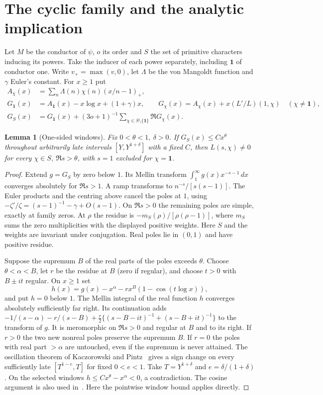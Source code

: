\documentclass[letterpaper,11pt]{article}
\newtheorem{lemma}[proposition]{Lemma}
\begin{document}
\section{The cyclic family and the analytic implication}\label{sec:analytic}
Let \(M\) be the conductor of \(\psi\), \(o\) its order and \(S\) the set of primitive characters inducing its powers. Take the inducer of each power separately, including \(\mathbf1\) of conductor one. Write \(v_+=\max(v,0)\), let \(\Lambda\) be the von Mangoldt function and \(\gamma\) Euler's constant. For \(x\ge1\) put
\begin{align*}
 A_\chi(x)&=\sum_n\Lambda(n)\chi(n)(x/n-1)_+,\\
 G_{\mathbf1}(x)&=A_{\mathbf1}(x)-x\log x+(1+\gamma)x,\qquad
 G_\chi(x)=A_\chi(x)+x(L'/L)(1,\chi)\quad(\chi\ne\mathbf1),\\
 G_S(x)&=G_{\mathbf1}(x)+(3o+1)^{-1}\sum_{\chi\in S\setminus\{\mathbf1\}}\Re G_\chi(x).
\end{align*}
\begin{lemma}[One-sided windows]\label{lem:landau}
Fix \(0<\theta<1,\ \delta>0\). If \(G_S(x)\le Cx^\theta\) throughout arbitrarily late intervals \([Y,Y^{1+\delta}]\) with a fixed \(C\), then \(L(s,\chi)\ne0\) for every \(\chi\in S,\ \Re s>\theta\), with \(s=1\) excluded for \(\chi=\mathbf1\).
\end{lemma}
\begin{proof}
Extend \(g=G_S\) by zero below \(1\). Its Mellin transform \(\int_1^\infty g(x)x^{-s-1}\,dx\) converges absolutely for \(\Re s>1\). A ramp transforms to \(n^{-s}/[s(s-1)]\). The Euler products and the centring above cancel the poles at \(1\), using \(-\zeta'/\zeta=(s-1)^{-1}-\gamma+O(s-1)\). On \(\Re s>0\) the remaining poles are simple, exactly at family zeros. At \(\rho\) the residue is \(-m_S(\rho)/[\rho(\rho-1)]\), where \(m_S\) sums the zero multiplicities with the displayed positive weights. Here \(S\) and the weights are invariant under conjugation. Real poles lie in \((0,1)\) and have positive residue.

Suppose the supremum \(B\) of the real parts of the poles exceeds \(\theta\). Choose \(\theta<\alpha<B\), let \(r\) be the residue at \(B\) (zero if regular), and choose \(t>0\) with \(B\pm it\) regular. On \(x\ge1\) set
\[
 h(x)=g(x)-x^\alpha-rx^B(1-\cos(t\log x)),
\]
and put \(h=0\) below \(1\). The Mellin integral of the real function \(h\) converges absolutely sufficiently far right. Its continuation adds
\(-1/(s-\alpha)-r/(s-B)+\tfrac r2\{(s-B-it)^{-1}+(s-B+it)^{-1}\}\)
to the transform of \(g\). It is meromorphic on \(\Re s>0\) and regular at \(B\) and to its right. If \(r>0\) the two new nonreal poles preserve the supremum \(B\). If \(r=0\) the poles with real part \(>\alpha\) are untouched, even if the supremum is never attained. The oscillation theorem of Kaczorowski and Pintz~\cite[Cor.~1 and (2.2)]{kp} gives a sign change on every sufficiently late \([T^{1-e},T]\) for fixed \(0<e<1\). Take \(T=Y^{1+\delta}\) and \(e=\delta/(1+\delta)\). On the selected windows \(h\le Cx^\theta-x^\alpha<0\), a contradiction. The cosine argument is also used in~\cite[\S5]{three}. Here the pointwise window bound applies directly.
\end{proof}
\end{document}
